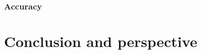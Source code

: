 \documentclass[a4paper]{report}
\begin{document}
	\subsection{Accuracy}
	
	
\chapter{Conclusion and perspective}
 


  
\end{document}
